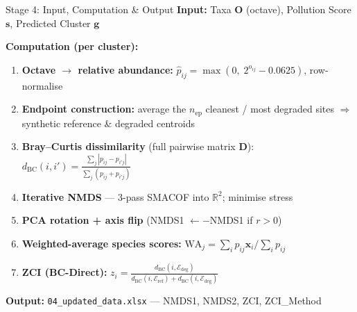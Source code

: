 \documentclass[aspectratio=169, 11pt]{beamer}
\newcommand{\code}[1]{\texttt{\small #1}}
\newcommand{\mat}[1]{\mathbf{#1}}
\newcommand{\R}{\mathbb{R}}
\newcommand{\BC}{\mathrm{BC}}
\begin{document}
\begin{frame}{Stage 4: Input, Computation \& Output}
  \textbf{Input:} Taxa $\mat{O}$ (octave), Pollution Score $\mathbf{s}$,
  Predicted Cluster $\mathbf{g}$

  \vspace{0.3em}
  \textbf{Computation (per cluster):}
  \begin{enumerate}\small
    \item \textbf{Octave $\to$ relative abundance:}
          $\hat{p}_{ij} = \max(0,\; 2^{o_{ij}} - 0.0625)$, row-normalise
    \item \textbf{Endpoint construction:} average the $n_{\text{ep}}$
          cleanest / most degraded sites $\Rightarrow$ synthetic reference
          \& degraded centroids
    \item \textbf{Bray--Curtis dissimilarity} (full pairwise matrix $\mat{D}$):
          $d_{\BC}(i,i') = \frac{\sum_j |p_{ij} - p_{i'j}|}{\sum_j (p_{ij} + p_{i'j})}$
    \item \textbf{Iterative NMDS} --- 3-pass SMACOF into $\R^2$; minimise stress
    \item \textbf{PCA rotation + axis flip} (NMDS1 $\leftarrow -$NMDS1 if $r > 0$)
    \item \textbf{Weighted-average species scores:}
          $\mathrm{WA}_j = \sum_i p_{ij}\mathbf{x}_i / \sum_i p_{ij}$
    \item \textbf{ZCI (BC-Direct):}
          $z_i = \frac{d_{\BC}(i, \mathcal{E}_{\text{deg}})}
                      {d_{\BC}(i, \mathcal{E}_{\text{ref}}) + d_{\BC}(i, \mathcal{E}_{\text{deg}})}$
  \end{enumerate}

  \vspace{0.2em}
  \textbf{Output:} \code{04\_updated\_data.xlsx} --- NMDS1, NMDS2, ZCI, ZCI\_Method
\end{frame}
\end{document}
